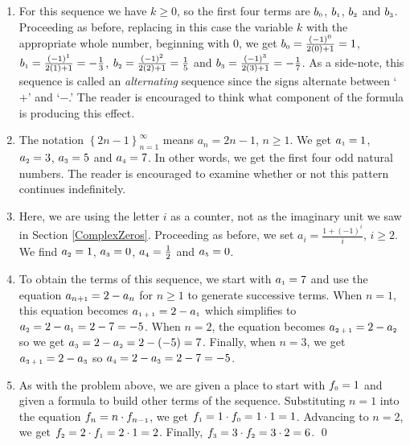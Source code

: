 \documentclass{ximera}
\begin{document}
\begin{ex}
\begin{enumerate}
\item For this sequence we have $k \geq 0$, so the first four terms are $b_{\text{\tiny$0$}}$, $b_{\text{\tiny$1$}}$, $b_{\text{\tiny$2$}}$ and $b_{\text{\tiny$3$}}$.  Proceeding as before, replacing in this case the variable $k$ with the appropriate whole number, beginning with $0$, we get $b_{\text{\tiny$0$}} = \frac{(-1)^{0}}{2(0)+1} = 1$, $b_{\text{\tiny$1$}} = \frac{(-1)^{1}}{2(1)+1} = - \frac{1}{3}$, $b_{\text{\tiny$2$}} = \frac{(-1)^{2}}{2(2)+1} = \frac{1}{5}$ and $b_{\text{\tiny$3$}} =  \frac{(-1)^{3}}{2(3)+1} = -\frac{1}{7}$.  As a side-note, this sequence is called an  \textit{alternating} sequence since the signs alternate between `$+$' and `$-$.' The reader is encouraged to think what component of the formula is producing this effect.

\item  The notation $\left\{ 2n - 1 \right\}_{n=1}^{\infty}$ means  $a_{n} = 2n -1$, $n \geq 1$.  We get $a_{\text{\tiny$1$}} = 1$, $a_{\text{\tiny$2$}} = 3$, $a_{\text{\tiny$3$}} = 5$ and $a_{\text{\tiny$4$}} = 7$.  In other words, we get the first four odd natural numbers.  The reader is encouraged to examine whether or not this pattern continues indefinitely.

\item  Here, we are using the letter $i$ as a counter, not as the imaginary unit we saw in Section \ref{ComplexZeros}.  Proceeding as before, we set $a_{i} = \frac{1 + (-1)^{i}}{i}$, $i \geq 2$.  We find $a_{\text{\tiny$2$}} = 1$, $a_{\text{\tiny$3$}} = 0$, $a_{\text{\tiny$4$}} = \frac{1}{2}$ and $a_{\text{\tiny$5$}} = 0$.  

\item  To obtain the terms of this sequence, we start with $a_{\text{\tiny$1$}} = 7$ and use the equation $a_{n \text{+\tiny$1$}} = 2 - a_{n}$ for $n \geq 1$ to generate successive terms.  When $n = 1$, this equation becomes $a_{\text{\tiny$1 + 1$}} = 2 - a_{\text{\tiny$1$}}$ which simplifies to $a_{\text{\tiny$2$}} = 2 - a_{\text{\tiny$1$}} = 2 - 7 = -5$.  When $n = 2$, the equation becomes $a_{\text{\tiny$2 + 1$}} = 2 - a_{\text{\tiny$2$}}$ so we get $a_{\text{\tiny$3$}} = 2 - a_{\text{\tiny$2$}} = 2 - (-5) = 7$.  Finally, when $n = 3$, we get $a_{\text{\tiny$3 + 1$}} = 2 - a_{\text{\tiny$3$}}$ so $a_{\text{\tiny$4$}} = 2 - a_{\text{\tiny$3$}} = 2-7 = -5$.  

\item  As with the problem above, we are given a place to start with $f_{\text{\tiny$0$}} = 1$ and given a formula to build other terms of the sequence.  Substituting $n = 1$ into the equation $f_{n} = n \cdot f_{n-\text{\tiny$1$}}$, we get $f_{\text{\tiny$1$}} = 1 \cdot f_{\text{\tiny$0$}} = 1 \cdot 1 = 1$.  Advancing to $n = 2$, we get $f_{\text{\tiny$2$}} = 2 \cdot f_{\text{\tiny$1$}} = 2 \cdot 1 = 2$.  Finally, $f_{\text{\tiny$3$}} = 3 \cdot f_{\text{\tiny$2$}} = 3 \cdot 2 = 6$.  \qed

\end{enumerate}

\end{ex}
\end{document}

